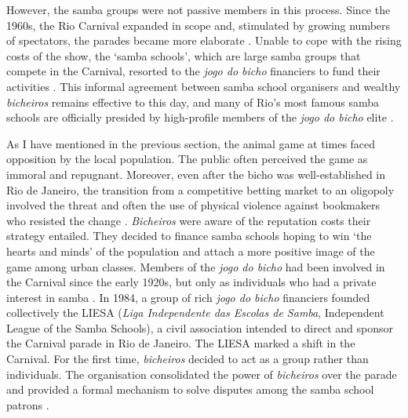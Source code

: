 However, the samba groups were not passive members in this process. Since the 1960s, the Rio Carnival expanded in scope and, stimulated by growing numbers of spectators, the parades became more elaborate \citetext{\citealp{cabral2016escolas}; \citealp[214]{chinelli1993vazio}; \citealp[240]{hertzman2013making}}. Unable to cope with the rising costs of the show, the `samba schools', which are large samba groups that compete in the Carnival, resorted to the \emph{jogo do bicho} financiers to fund their activities \citep{misse2007illegal}. This informal agreement between samba school organisers and wealthy \emph{bicheiros} remains effective to this day, and many of Rio's most famous samba schools are officially presided by high-profile members of the \emph{jogo do bicho} elite \citep{bezerra2009mecenato,cavalcanti2006carnaval,farias2013carnival,misse2011crime,queiroz1992carnaval}.

As I have mentioned in the previous section, the animal game at times faced opposition by the local population. The public often perceived the game as immoral and repugnant. Moreover, even after the bicho was well-established in Rio de Janeiro, the transition from a competitive betting market to an oligopoly involved the threat and often the use of physical violence against bookmakers who resisted the change \citetext{\citealp[143]{bezerra2009mecenato}, \citealp[52]{labronici2012paratodos}}. \emph{Bicheiros} were aware of the reputation costs their strategy entailed. They decided to finance samba schools hoping to win `the hearts and minds' of the population and attach a more positive image of the game among urban classes. Members of the \emph{jogo do bicho} had been involved in the Carnival since the early 1920s, but only as individuals who had a private interest in samba \citep[209]{chinelli1993vazio}. In 1984, a group of rich \emph{jogo do bicho} financiers founded collectively the LIESA (\emph{Liga Independente das Escolas de Samba}, Independent League of the Samba Schools), a civil association intended to direct and sponsor the Carnival parade in Rio de Janeiro. The LIESA marked a shift in the Carnival. For the first time, \emph{bicheiros} decided to act as a group rather than individuals. The organisation consolidated the power of \emph{bicheiros} over the parade and provided a formal mechanism to solve disputes among the samba school patrons \citetext{\citealp[43]{cavalcanti2006carnaval}; \citealp[171]{farias2013carnival}; \citealp[55]{labronici2012paratodos}}.


